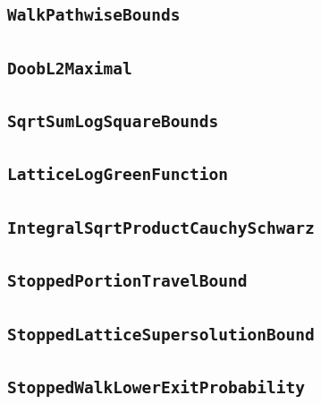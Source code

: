 \documentclass[11pt]{amsart}
\theoremstyle{definition}
\begin{document}
\subsection{\texorpdfstring{\texttt{WalkPathwiseBounds}}{WalkPathwiseBounds}}\label{node:WalkPathwiseBounds}


\subsection{\texorpdfstring{\texttt{DoobL2Maximal}}{DoobL2Maximal}}\label{node:DoobL2Maximal}


\subsection{\texorpdfstring{\texttt{SqrtSumLogSquareBounds}}{SqrtSumLogSquareBounds}}\label{node:SqrtSumLogSquareBounds}


\subsection{\texorpdfstring{\texttt{LatticeLogGreenFunction}}{LatticeLogGreenFunction}}\label{node:LatticeLogGreenFunction}


\subsection{\texorpdfstring{\texttt{IntegralSqrtProductCauchySchwarz}}{IntegralSqrtProductCauchySchwarz}}\label{node:IntegralSqrtProductCauchySchwarz}


\subsection{\texorpdfstring{\texttt{StoppedPortionTravelBound}}{StoppedPortionTravelBound}}\label{node:StoppedPortionTravelBound}


\subsection{\texorpdfstring{\texttt{StoppedLatticeSupersolutionBound}}{StoppedLatticeSupersolutionBound}}\label{node:StoppedLatticeSupersolutionBound}


\subsection{\texorpdfstring{\texttt{StoppedWalkLowerExitProbability}}{StoppedWalkLowerExitProbability}}\label{node:StoppedWalkLowerExitProbability}

\end{document}
